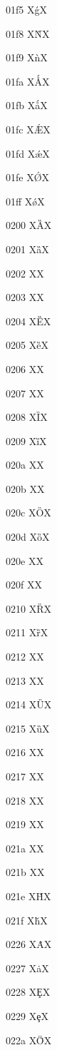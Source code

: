 \documentclass[11pt]{article}
\begin{document}
01f5 X{\'g}X

01f8 X{\`N}X

01f9 X{\`n}X

01fa X{\'{\AA}}X

01fb X{\'{\aa}}X

01fc X{\'{\AE}}X

01fd X{\'{\ae}}X

01fe X{\'{\O}}X

01ff X{\'{\o}}X

0200 X{\G{A}}X

0201 X{\G{a}}X

0202 X{}X

0203 X{}X

0204 X{\G{E}}X

0205 X{\G{e}}X

0206 X{}X

0207 X{}X

0208 X{\G{I}}X

0209 X{\G{i}}X

020a X{}X

020b X{}X

020c X{\G{O}}X

020d X{\G{o}}X

020e X{}X

020f X{}X

0210 X{\G{R}}X

0211 X{\G{r}}X

0212 X{}X

0213 X{}X

0214 X{\G{U}}X

0215 X{\G{u}}X

0216 X{}X

0217 X{}X

0218 X{}X

0219 X{}X

021a X{}X

021b X{}X

021e X{\v{H}}X

021f X{\v{h}}X

0226 X{\.A}X

0227 X{\.a}X

0228 X{\c{E}}X

0229 X{\c{e}}X

022a X{\={\"{O}}}X
\end{document}
